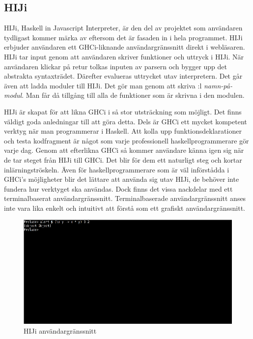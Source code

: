 \subsection{HIJi}
HIJi, Haskell in Javascript Interpreter, är den del av projektet som användaren tydligast kommer märka av eftersom det är fasaden in i hela programmet.
HIJi erbjuder användaren ett GHCi-liknande användargränssnitt direkt i webläsaren. 
HIJi tar input genom att användaren skriver funktioner och uttryck i HIJi. När användaren klickar på retur tolkas inputen av parsern och bygger upp det abstrakta syntaxträdet. Därefter evalueras uttrycket utav interpretern.
Det går även att ladda moduler till HIJi. Det gör man genom att skriva :l \emph{namn-på-modul}. Man får då tillgång till alla de funktioner som är skrivna i den modulen. 

HIJi är skapat för att likna GHCi i så stor utsträckning som möjligt. Det finns väldigt goda anledningar till att göra detta. Dels är GHCi ett mycket kompetent verktyg när man programmerar i Haskell. Att kolla upp funktionsdeklarationer och testa kodfragment är något som varje professionell haskellprogrammerare gör varje dag. Genom att efterlikna GHCi så kommer användare känna igen sig när de tar steget från HIJi till GHCi. Det blir för dem ett naturligt steg och kortar inlärningströskeln. Även för haskellprogrammerare som är väl införstådda i GHCi's möjligheter blir det lättare att använda sig utav HIJi, de behöver inte fundera hur verktyget ska användas.
Dock finns det vissa nackdelar med ett terminalbaserat användargränssnitt. Terminalbaserade användargränssnitt anses inte vara lika enkelt och intuitivt att förstå som ett grafiskt användargränssnitt. 



\begin{figure}[H]
    \begin{center}
        \includegraphics[width=1\textwidth]{hiji_screen3.png}
        \caption{HIJi användargränssnitt}
    \end{center}
\end{figure}

